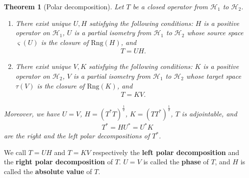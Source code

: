 \documentclass[12pt,a4paper,notitlepage]{article}
\theoremstyle{definition}
\theoremstyle{plain}
\newtheorem{thm}[df]{Theorem}
\newcommand{\mc}{\mathcal}
\newcommand{\sgm}{\varsigma}
\newcommand{\Rng}{\mathrm{Rng}}
\numberwithin{equation}{section}
\begin{document}
\begin{thm}[Polar decomposition]\label{lb22}
Let $T$ be a closed operator from $\mc H_1$ to $\mc H_2$. 
\begin{enumerate}
\item There exist unique $U,H$ satisfying the following conditions:   $H$ is a positive operator on $\mc H_1$, $U$ is a partial isometry from $\mc H_1$ to $\mc H_2$ whose source space $\sgm(U)$ is the closure of $\Rng(H)$, and
\begin{align*}
	T=UH.
\end{align*} 
\item There exist unique $V,K$ satisfying the following conditions:   $K$ is a positive operator on $\mc H_2$, $V$ is a partial isometry from $\mc H_1$ to $\mc H_2$ whose target space $\tau(V)$ is the closure of $\Rng(K)$, and
\begin{align*}
	T=KV.
\end{align*} 
\end{enumerate}
Moreover, we have $U=V$, $H=(T^*T)^{\frac 12}$,  $K=(TT^*)^{\frac 12}$, $T$ is adjointable, and
\begin{align*}
T^*=HU^*=U^*K	
\end{align*}
are the right and the left  polar decompositions of $T^*$.
\end{thm}

We call $T=UH$ and $T=KV$ respectively the \textbf{left polar decomposition} and the \textbf{right polar decomposition} of $T$. $U=V$ is called the \textbf{phase} of $T$, and $H$ is called the \textbf{absolute value} of $T$. 
\end{document}
